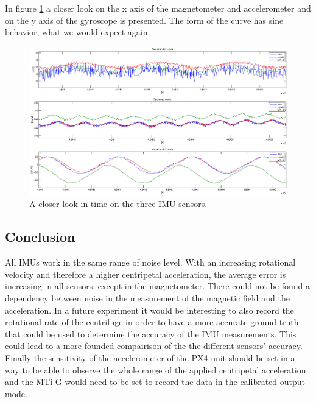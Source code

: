 In figure \ref{ct_sine} a closer look on the x axis of the magnetometer and accelerometer and on the y axis of the gyroscope is presented. The form of the curve has sine behavior, what we would expect again.
\begin{figure}[h]
\includegraphics[width=1.2\textwidth]{pictures/ct_sine.eps}
\caption{A closer look in time on the three IMU sensors.}
\label{ct_sine}
\end{figure}

\subsection{Conclusion}
All IMUs work in the same range of noise level. With an increasing rotational velocity and therefore a higher centripetal acceleration, the average error is increasing in all sensors, except in the magnetometer. There could not be found a dependency between noise in the measurement of the magnetic field and the acceleration. 
In a future experiment it would be interesting to also record the rotational rate of the centrifuge in order to have a more accurate ground truth that could be used to determine the accuracy of the IMU measurements. This could lead to a more founded compairison of the the different sensors' accuracy. Finally the sensitivity of the accelerometer of the PX4 unit should be set in a way to be able to observe the whole range of the applied centripetal acceleration and the MTi-G would need to be set to record the data in the calibrated output mode.

